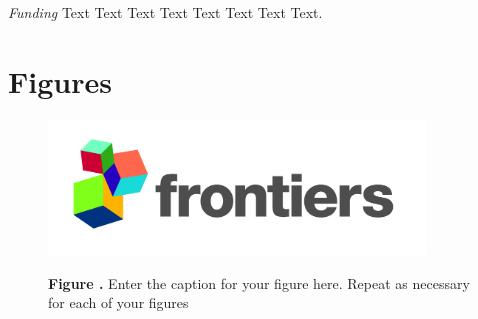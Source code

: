 \documentclass{frontiersSCNS} %
\begin{document}
\textit{Funding\textcolon} Text Text Text Text Text Text  Text Text.




\section*{Figures}


\begin{figure}[h!]
\begin{center}
\includegraphics[width=10cm]{logo1}%
\end{center}
 \textbf{\label{fig:01} Figure .}{ Enter the caption for your figure here.  Repeat as  necessary for each of your figures }
\end{figure}




\end{document}
